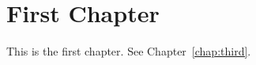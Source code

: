 \chapter{First Chapter}
\label{chap:first}
This is the first chapter. See Chapter~\ref{chap:third}.
